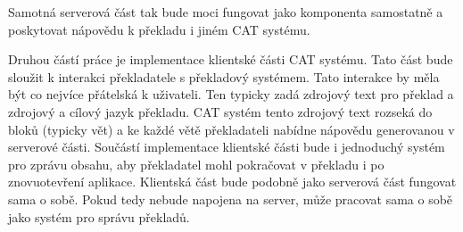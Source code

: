 Samotná serverová část tak bude moci fungovat jako komponenta samostatně a poskytovat nápovědu k překladu i jiném CAT systému.

Druhou částí práce je implementace klientské části CAT systému. Tato část bude sloužit k interakci překladatele s překladový systémem. Tato interakce by měla být co nejvíce přátelská k uživateli. Ten typicky zadá zdrojový text pro překlad a zdrojový a cílový jazyk překladu. CAT systém tento zdrojový text rozseká do bloků (typicky vět) a ke každé větě překladateli nabídne nápovědu generovanou v serverové části. Součástí implementace klientské části bude i jednoduchý systém pro zprávu obsahu, aby překladatel mohl pokračovat v překladu i po znovuotevření aplikace. Klientská část bude podobně jako serverová část fungovat sama o sobě. Pokud tedy nebude napojena na server, může pracovat sama o sobě jako systém pro správu překladů.


